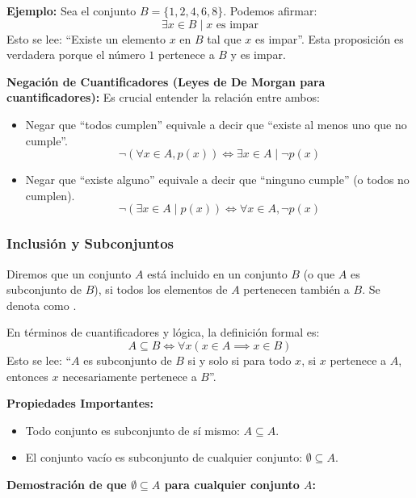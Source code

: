 \noindent \textbf{Ejemplo:}
Sea el conjunto $B=\{ 1,2,4,6,8\}$. Podemos afirmar:
\[ \exists x \in B \mid x \text{ es impar} \]
Esto se lee: ``Existe un elemento $x$ en $B$ tal que $x$ es impar''. Esta proposición es verdadera porque el número $1$ pertenece a $B$ y es impar.

\vspace{0.3cm}

\noindent \textbf{Negación de Cuantificadores (Leyes de De Morgan para cuantificadores):}
Es crucial entender la relación entre ambos:
\begin{itemize}
    \item Negar que ``todos cumplen'' equivale a decir que ``existe al menos uno que no cumple''.
    \[ \neg (\forall x \in A, p(x)) \iff \exists x \in A \mid \neg p(x) \]
    \item Negar que ``existe alguno'' equivale a decir que ``ninguno cumple'' (o todos no cumplen).
    \[ \neg (\exists x \in A \mid p(x)) \iff \forall x \in A, \neg p(x) \]
\end{itemize}

\subsubsection{Inclusión y Subconjuntos}

Diremos que un conjunto $A$ está incluido en un conjunto $B$ (o que $A$ es subconjunto de $B$), si todos los elementos de $A$ pertenecen también a $B$. Se denota como .

En términos de cuantificadores y lógica, la definición formal es:
\[ A \subseteq B \iff \forall x (x \in A \implies x \in B) \]
Esto se lee: ``$A$ es subconjunto de $B$ si y solo si para todo $x$, si $x$ pertenece a $A$, entonces $x$ necesariamente pertenece a $B$''.

\vspace{0.2cm}
\noindent \textbf{Propiedades Importantes:}
\begin{itemize}
    \item Todo conjunto es subconjunto de sí mismo: $A \subseteq A$.
    \item El conjunto vacío es subconjunto de cualquier conjunto: $\emptyset \subseteq A$.
\end{itemize}
\noindent \textbf{Demostración de que $\emptyset \subseteq A$ para cualquier conjunto $A$:}


